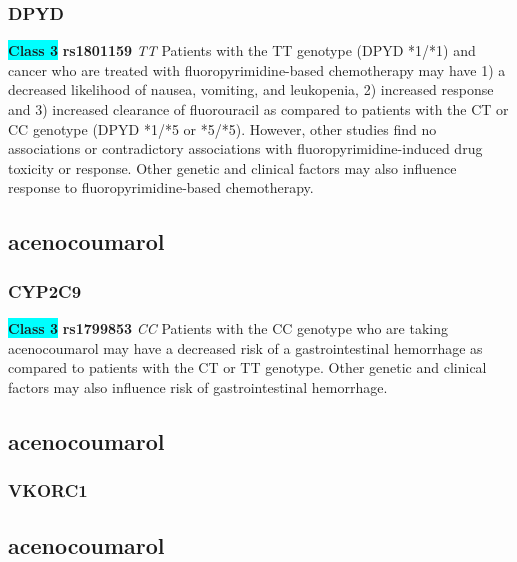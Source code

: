 \documentclass{book}
\begin{document}
\subsubsection{ DPYD }

\begin{center}
\textbf{\colorbox{cyan} {Class 3}} \textbf{ rs1801159 } \textit{ TT }
Patients with the TT genotype (DPYD *1/*1) and cancer who are treated with fluoropyrimidine-based chemotherapy may have 1) a decreased likelihood of nausea, vomiting, and leukopenia, 2) increased response and 3) increased clearance of fluorouracil as compared to patients with the CT or CC genotype (DPYD *1/*5 or *5/*5). However, other studies find no associations or contradictory associations with fluoropyrimidine-induced drug toxicity or response. Other genetic and clinical factors may also influence response to fluoropyrimidine-based chemotherapy.


\end{center}\subsection{ acenocoumarol }


\subsubsection{ CYP2C9 }

\begin{center}
\textbf{\colorbox{cyan} {Class 3}} \textbf{ rs1799853 } \textit{ CC }
Patients with the CC genotype who are taking acenocoumarol may have a decreased risk of a gastrointestinal hemorrhage as compared to patients with the CT or TT genotype. Other genetic and clinical factors may also influence risk of gastrointestinal hemorrhage.


\end{center}\subsection{ acenocoumarol }


\subsubsection{ VKORC1 }

\begin{center}



\end{center}\subsection{ acenocoumarol }
\end{document}
